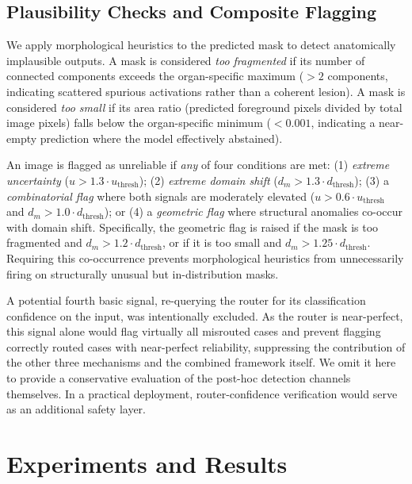 \documentclass[a4paper,conference]{IEEEtran}
\begin{document}
\subsection{Plausibility Checks and Composite Flagging}

We apply morphological heuristics to the predicted mask to detect anatomically implausible outputs. A mask is considered \emph{too fragmented} if its number of connected components exceeds the organ-specific maximum ($>2$ components, indicating scattered spurious activations rather than a coherent lesion). A mask is considered \emph{too small} if its area ratio (predicted foreground pixels divided by total image pixels) falls below the organ-specific minimum ($<0.001$, indicating a near-empty prediction where the model effectively abstained).

An image is flagged as unreliable if \emph{any} of four conditions are met: (1) \emph{extreme uncertainty} ($u > 1.3 \cdot u_{\text{thresh}}$); (2) \emph{extreme domain shift} ($d_m > 1.3 \cdot d_{\text{thresh}}$); (3) a \emph{combinatorial flag} where both signals are moderately elevated ($u > 0.6 \cdot u_{\text{thresh}}$ and $d_m > 1.0 \cdot d_{\text{thresh}}$); or (4) a \emph{geometric flag} where structural anomalies co-occur with domain shift. Specifically, the geometric flag is raised if the mask is too fragmented and $d_m > 1.2 \cdot d_{\text{thresh}}$, or if it is too small and $d_m > 1.25 \cdot d_{\text{thresh}}$. Requiring this co-occurrence prevents morphological heuristics from unnecessarily firing on structurally unusual but in-distribution masks.

A potential fourth basic signal, re-querying the router for its classification confidence on the input, was intentionally excluded. As the router is near-perfect, this signal alone would flag virtually all misrouted cases and prevent flagging correctly routed cases with near-perfect reliability, suppressing the contribution of the other three mechanisms and the combined framework itself. We omit it here to provide a conservative evaluation of the post-hoc detection channels themselves. In a practical deployment, router-confidence verification would serve as an additional safety layer.

\section{Experiments and Results}
\end{document}

